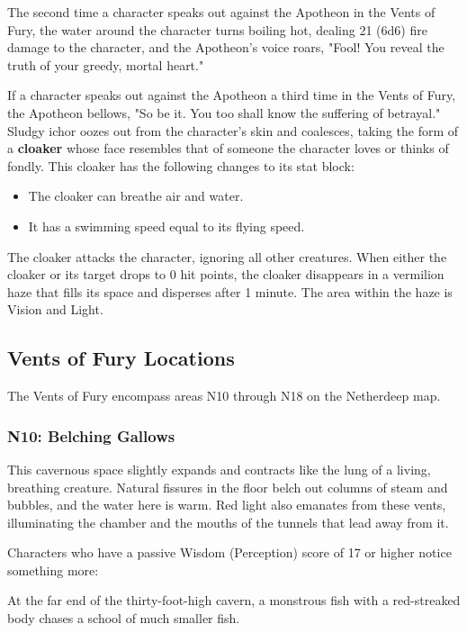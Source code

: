 \documentclass[a4paper, 11pt, bg=full, twocolumn, nooutline]{dndbook}
\begin{document}
The second time a character speaks out against the Apotheon in the Vents of Fury, the water around the character turns boiling hot, dealing 21 (6d6) fire damage to the character, and the Apotheon's voice roars, "Fool! You reveal the truth of your greedy, mortal heart."

If a character speaks out against the Apotheon a third time in the Vents of Fury, the Apotheon bellows, "So be it. You too shall know the suffering of betrayal." Sludgy ichor oozes out from the character's skin and coalesces, taking the form of a \textbf{cloaker} whose face resembles that of someone the character loves or thinks of fondly. This cloaker has the following changes to its stat block:

\begin{itemize}
\item The cloaker can breathe air and water.
\item It has a swimming speed equal to its flying speed.
\end{itemize}

The cloaker attacks the character, ignoring all other creatures. When either the cloaker or its target drops to 0 hit points, the cloaker disappears in a vermilion haze that fills its space and disperses after 1 minute. The area within the haze is Vision and Light.

\subsection{Vents of Fury Locations}

The Vents of Fury encompass areas N10 through N18 on the Netherdeep map.

\subsubsection{N10: Belching Gallows}

\begin{DndReadAloud}
This cavernous space slightly expands and contracts like the lung of a living, breathing creature. Natural fissures in the floor belch out columns of steam and bubbles, and the water here is warm. Red light also emanates from these vents, illuminating the chamber and the mouths of the tunnels that lead away from it.
\end{DndReadAloud}

Characters who have a passive Wisdom (Perception) score of 17 or higher notice something more:

\begin{DndReadAloud}
At the far end of the thirty-foot-high cavern, a monstrous fish with a red-streaked body chases a school of much smaller fish.
\end{DndReadAloud}
\end{document}
